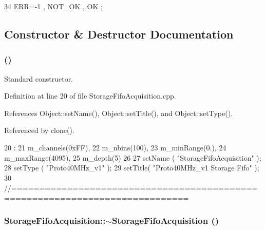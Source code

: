 \begin{DoxyCode}
34 { ERR=-1 , NOT_OK , OK };
\end{DoxyCode}


\subsection{Constructor \& Destructor Documentation}
\hypertarget{classStorageFifoAcquisition_a32975d5adfb2fbeeaf18b50be5fb58fe}{
\subsubsection[{StorageFifoAcquisition}]{ ()}}
\label{classStorageFifoAcquisition_a32975d5adfb2fbeeaf18b50be5fb58fe}


Standard constructor. 

Definition at line 20 of file StorageFifoAcquisition.cpp.

References Object::setName(), Object::setTitle(), and Object::setType().

Referenced by clone().


\begin{DoxyCode}
20                                                  :
21   m_channels(0xFF),
22   m_nbins(100),
23   m_minRange(0.),
24   m_maxRange(4095),
25   m_depth(5)
26 {
27   setName ( "StorageFifoAcquisition" );
28   setType ( "Proto40MHz_v1" );
29   setTitle( "Proto40MHz_v1 Storage Fifo" );
30 }
//=============================================================================
\end{DoxyCode}
\hypertarget{classStorageFifoAcquisition_acfa89ab91baa3dbd3a8651992c396cf3}{
\subsubsection[{$\sim$StorageFifoAcquisition}]{\setlength{\rightskip}{0pt plus 5cm}StorageFifoAcquisition::$\sim$StorageFifoAcquisition ()}}
\label{classStorageFifoAcquisition_acfa89ab91baa3dbd3a8651992c396cf3}


